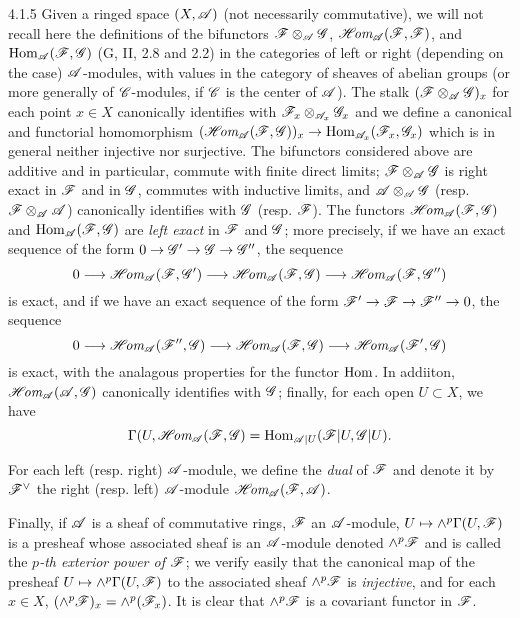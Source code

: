 \begin{env}{4.1.5}
\label{env-0.4.1.5}
Given a ringed space $(X,\mathscr{A})$ (not necessarily commutative), we will not
recall here the definitions of the bifunctors $\mathscr{F}\otimes_\mathscr{A}\mathscr{G}$,
$\mathscr{H}\!\textit{om}_\mathscr{A}(\mathscr{F},\mathscr{F})$, and ${\mathop{\mathrm{Hom}}\nolimits}_\mathscr{A}(\mathscr{F},\mathscr{G})$
(G, II, 2.8 and 2.2) in the categories of left or right (depending on the case)
$\mathscr{A}$-modules, with values in the category of sheaves of abelian groups (or
more generally of $\mathscr{C}$-modules, if $\mathscr{C}$ is the center of $\mathscr{A}$). The
stalk $(\mathscr{F}\otimes_\mathscr{A}\mathscr{G})_x$ for each point $x\in X$ canonically
identifies with $\mathscr{F}_x\otimes_{\mathscr{A}_x}\mathscr{G}_x$ and we define a canonical
and functorial homomorphism
$(\mathscr{H}\!\textit{om}_\mathscr{A}(\mathscr{F},\mathscr{G}))_x\to{\mathop{\mathrm{Hom}}\nolimits}_{\mathscr{A}_x}(\mathscr{F}_x,\mathscr{G}_x)$ which is
in general neither injective nor surjective. The bifunctors considered above are
additive and in particular, commute with finite direct limits;
$\mathscr{F}\otimes_\mathscr{A}\mathscr{G}$ is right exact in $\mathscr{F}$ and in $\mathscr{G}$,
commutes with inductive limits, and $\mathscr{A}\otimes_\mathscr{A}\mathscr{G}$
(resp. $\mathscr{F}\otimes_\mathscr{A}\mathscr{A}$) canonically identifies with $\mathscr{G}$
(resp. $\mathscr{F}$). The functors $\mathscr{H}\!\textit{om}_\mathscr{A}(\mathscr{F},\mathscr{G})$ and
${\mathop{\mathrm{Hom}}\nolimits}_\mathscr{A}(\mathscr{F},\mathscr{G})$ are \emph{left exact} in $\mathscr{F}$ and $\mathscr{G}$;
more precisely, if we have an exact sequence of the form
$0\to\mathscr{G}'\to\mathscr{G}\to\mathscr{G}''$, the sequence
\[
  0\longrightarrow\mathscr{H}\!\textit{om}_\mathscr{A}(\mathscr{F},\mathscr{G}')\longrightarrow
  \mathscr{H}\!\textit{om}_\mathscr{A}(\mathscr{F},\mathscr{G})\longrightarrow\mathscr{H}\!\textit{om}_\mathscr{A}(\mathscr{F},\mathscr{G}'')
\]
is exact, and if we have an exact sequence of the form
$\mathscr{F}'\to\mathscr{F}\to\mathscr{F}''\to 0$, the sequence
\[
  0\longrightarrow\mathscr{H}\!\textit{om}_\mathscr{A}(\mathscr{F}'',\mathscr{G})\longrightarrow
  \mathscr{H}\!\textit{om}_\mathscr{A}(\mathscr{F},\mathscr{G})\longrightarrow\mathscr{H}\!\textit{om}_\mathscr{A}(\mathscr{F}',\mathscr{G})
\]
is exact, with the analagous properties for the functor ${\mathop{\mathrm{Hom}}\nolimits}$. In addiiton,
$\mathscr{H}\!\textit{om}_\mathscr{A}(\mathscr{A},\mathscr{G})$ canonically identifies with $\mathscr{G}$; finally,
for each open $U\subset X$, we have
\[
  \Gamma(U,\mathscr{H}\!\textit{om}_\mathscr{A}(\mathscr{F},\mathscr{G})={\mathop{\mathrm{Hom}}\nolimits}_{\mathscr{A}|U}(\mathscr{F}|U,\mathscr{G}|U).
\]

For each left (resp. right) $\mathscr{A}$-module, we define the \emph{dual} of
$\mathscr{F}$ and denote it by ${\mathscr{F}}^\vee$ the right (resp. left) $\mathscr{A}$-module
$\mathscr{H}\!\textit{om}_\mathscr{A}(\mathscr{F},\mathscr{A})$.

Finally, if $\mathscr{A}$ is a sheaf of commutative rings, $\mathscr{F}$ an
$\mathscr{A}$-module, $U\mapsto\wedge^p\Gamma(U,\mathscr{F})$ is a presheaf whose
associated sheaf is an $\mathscr{A}$-module denoted $\wedge^p\mathscr{F}$ and is called
the \emph{$p$-th exterior power of $\mathscr{F}$}; we verify easily that the
canonical map of the presheaf $U\mapsto\wedge^p\Gamma(U,\mathscr{F})$ to the
associated sheaf $\wedge^p\mathscr{F}$ is \emph{injective}, and for each $x\in X$,
$(\wedge^p\mathscr{F})_x=\wedge^p(\mathscr{F}_x)$. It is clear that $\wedge^p\mathscr{F}$ is a
covariant functor in $\mathscr{F}$.
\end{env}

